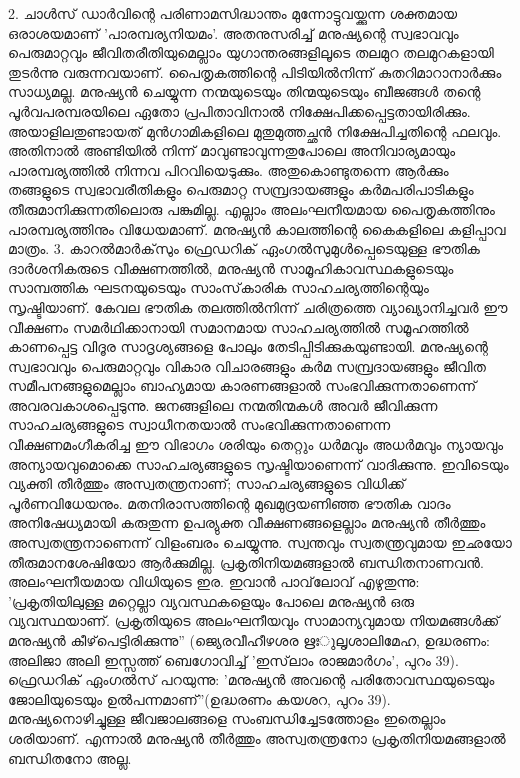 2. ചാള്‍സ് ഡാര്‍വിന്റെ പരിണാമസിദ്ധാന്തം മുന്നോട്ടുവയ്ക്കുന്ന ശക്തമായ ഒരാശയമാണ് 'പാരമ്പര്യനിയമം'. അതനുസരിച്ച് മനുഷ്യന്റെ സ്വഭാവവും പെരുമാറ്റവും ജീവിതരീതിയുമെല്ലാം യുഗാന്തരങ്ങളിലൂടെ തലമുറ തലമുറകളായി തുടര്‍ന്നു വരുന്നവയാണ്. പൈതൃകത്തിന്റെ പിടിയില്‍നിന്ന് കുതറിമാറാനാര്‍ക്കും സാധ്യമല്ല. മനുഷ്യന്‍ ചെയ്യുന്ന നന്മയുടെയും തിന്മയുടെയും ബീജങ്ങള്‍ തന്റെ പൂര്‍വപരമ്പരയിലെ ഏതോ പ്രപിതാവിനാല്‍ നിക്ഷേപിക്കപ്പെട്ടതായിരിക്കും. അയാളിലതുണ്ടായത് മുന്‍ഗാമികളിലെ മുതുമുത്തച്ഛന്‍ നിക്ഷേപിച്ചതിന്റെ ഫലവും. അതിനാല്‍ അണ്ടിയില്‍ നിന്ന് മാവുണ്ടാവുന്നതുപോലെ അനിവാര്യമായും പാരമ്പര്യത്തില്‍ നിന്നവ പിറവിയെടുക്കും. അതുകൊണ്ടുതന്നെ ആര്‍ക്കും തങ്ങളുടെ സ്വഭാവരീതികളും പെരുമാറ്റ സമ്പ്രദായങ്ങളും കര്‍മപരിപാടികളും തീരുമാനിക്കുന്നതിലൊരു പങ്കുമില്ല. എല്ലാം അലംഘനീയമായ പൈതൃകത്തിനും പാരമ്പര്യത്തിനും വിധേയമാണ്. മനുഷ്യന്‍ കാലത്തിന്റെ കൈകളിലെ കളിപ്പാവ മാത്രം.
3. കാറല്‍മാര്‍ക്‌സും ഫ്രെഡറിക് ഏംഗല്‍സുമുള്‍പ്പെടെയുള്ള ഭൗതിക ദാര്‍ശനികരുടെ വീക്ഷണത്തില്‍, മനുഷ്യന്‍ സാമൂഹികാവസ്ഥകളുടെയും സാമ്പത്തിക ഘടനയുടെയും സാംസ്‌കാരിക സാഹചര്യത്തിന്റെയും സൃഷ്ടിയാണ്. കേവല ഭൗതിക തലത്തില്‍നിന്ന് ചരിത്രത്തെ വ്യാഖ്യാനിച്ചവര്‍ ഈ വീക്ഷണം സമര്‍ഥിക്കാനായി സമാനമായ സാഹചര്യത്തില്‍ സമൂഹത്തില്‍ കാണപ്പെട്ട വിദൂര സാദൃശ്യങ്ങളെ പോലും തേടിപ്പിടിക്കുകയുണ്ടായി. മനുഷ്യന്റെ സ്വഭാവവും പെരുമാറ്റവും വികാര വിചാരങ്ങളും കര്‍മ സമ്പ്രദായങ്ങളും ജീവിത സമീപനങ്ങളുമെല്ലാം ബാഹ്യമായ കാരണങ്ങളാല്‍ സംഭവിക്കുന്നതാണെന്ന് അവരവകാശപ്പെടുന്നു. ജനങ്ങളിലെ നന്മതിന്മകള്‍ അവര്‍ ജീവിക്കുന്ന സാഹചര്യങ്ങളുടെ സ്വാധീനതയാല്‍ സംഭവിക്കുന്നതാണെന്ന വീക്ഷണമംഗീകരിച്ച ഈ വിഭാഗം ശരിയും തെറ്റും ധര്‍മവും അധര്‍മവും ന്യായവും അന്യായവുമൊക്കെ സാഹചര്യങ്ങളുടെ സൃഷ്ടിയാണെന്ന് വാദിക്കുന്നു. ഇവിടെയും വ്യക്തി തീര്‍ത്തും അസ്വതന്ത്രനാണ്; സാഹചര്യങ്ങളുടെ വിധിക്ക് പൂര്‍ണവിധേയനും.
മതനിരാസത്തിന്റെ മുഖമുദ്രയണിഞ്ഞ ഭൗതിക വാദം അനിഷേധ്യമായി കരുതുന്ന ഉപര്യുക്ത വീക്ഷണങ്ങളെല്ലാം മനുഷ്യന്‍ തീര്‍ത്തും അസ്വതന്ത്രനാണെന്ന് വിളംബരം ചെയ്യുന്നു. സ്വന്തവും സ്വതന്ത്രവുമായ ഇഛയോ തീരുമാനശേഷിയോ ആര്‍ക്കുമില്ല. പ്രകൃതിനിയമങ്ങളാല്‍ ബന്ധിതനാണവന്‍. അലംഘനീയമായ വിധിയുടെ ഇര. ഇവാന്‍ പാവ്‌ലോവ് എഴുതുന്നു: 'പ്രകൃതിയിലുള്ള മറ്റെല്ലാ വ്യവസ്ഥകളെയും പോലെ മനുഷ്യന്‍ ഒരു വ്യവസ്ഥയാണ്. പ്രകൃതിയുടെ അലംഘനീയവും സാമാന്യവുമായ നിയമങ്ങള്‍ക്ക് മനുഷ്യന്‍ കീഴ്‌പെട്ടിരിക്കുന്നു'' (ജ്യെരവീഹീഴശര ഋഃുലൃശാലിമേഹ, ഉദ്ധരണം: അലിജാ അലി ഇസ്സത്ത് ബെഗോവിച്ച് 'ഇസ്‌ലാം രാജമാര്‍ഗം', പുറം 39).
ഫ്രെഡറിക് ഏംഗല്‍സ് പറയുന്നു: 'മനുഷ്യന്‍ അവന്റെ പരിതോവസ്ഥയുടെയും ജോലിയുടെയും ഉല്‍പന്നമാണ്''(ഉദ്ധരണം കയശറ, പുറം 39).
മനുഷ്യനൊഴിച്ചുള്ള ജീവജാലങ്ങളെ സംബന്ധിച്ചേടത്തോളം ഇതെല്ലാം ശരിയാണ്. എന്നാല്‍ മനുഷ്യന്‍ തീര്‍ത്തും അസ്വതന്ത്രനോ പ്രകൃതിനിയമങ്ങളാല്‍ ബന്ധിതനോ അല്ല.

